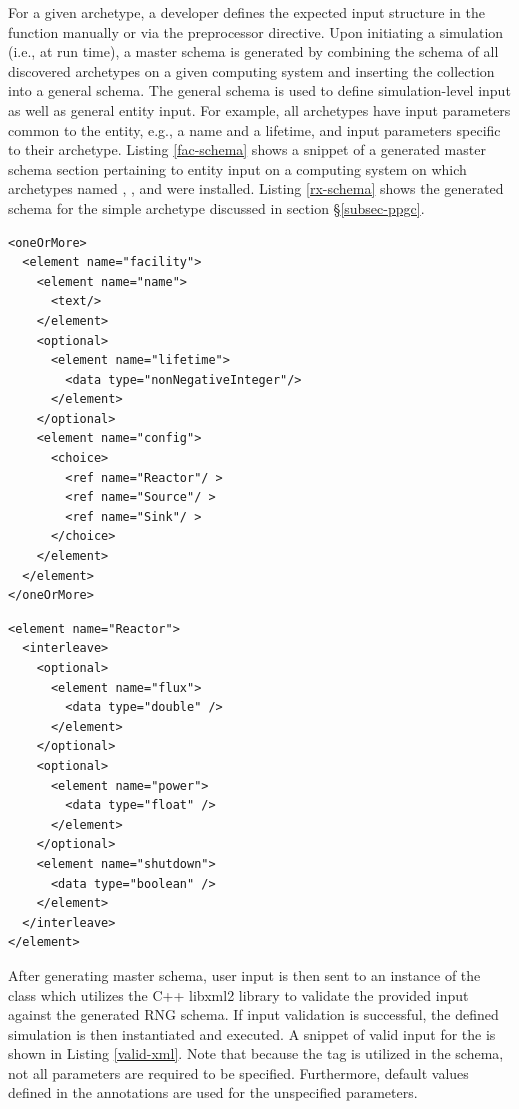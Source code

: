 For a given archetype, a developer defines the expected input structure in the
 function manually or via the 
preprocessor directive. Upon initiating a \Cyclus simulation (i.e., at run
time), a master schema is generated by combining the schema of all discovered
archetypes on a given computing system and inserting the collection into a
general \Cyclus schema. The general \Cyclus schema is used to define
simulation-level input as well as general entity input. For example, all
 archetypes have input parameters common to the
 entity, e.g., a name and a lifetime, and input
parameters specific to their archetype. Listing \ref{fac-schema} shows a snippet
of a generated \Cyclus master schema section pertaining to
 entity input on a computing system on which archetypes
named , , and  were installed. Listing
\ref{rx-schema} shows the generated schema for the simple 
archetype discussed in section \S \ref{subsec-ppgc}.

\lstset{language=XML}
\begin{lstlisting}[caption={Generated \Cyclus Facility Schema for a Computing System with 
      \code{Reactor}, \code{Source}, and \code{Sink} Archetypes Installed}, 
    label=fac-schema]
<oneOrMore>
  <element name="facility">
    <element name="name"> 
      <text/> 
    </element>
    <optional>
      <element name="lifetime"> 
        <data type="nonNegativeInteger"/> 
      </element>
    </optional>
    <element name="config">
      <choice>
        <ref name="Reactor"/ >
        <ref name="Source"/ >
        <ref name="Sink"/ >
      </choice>
    </element>
  </element>
</oneOrMore>
\end{lstlisting}

\lstset{language=XML}
\begin{lstlisting}[caption={Generated Simple Reactor Schema}, 
                   label=rx-schema]
<element name="Reactor">
  <interleave>
    <optional>
      <element name="flux">
        <data type="double" />
      </element>
    </optional>
    <optional>
      <element name="power">
        <data type="float" />
      </element>
    </optional>
    <element name="shutdown">
      <data type="boolean" />
    </element>
  </interleave>
</element>
\end{lstlisting}

After generating master \Cyclus schema, user input is then sent to an instance
of the  class which utilizes the C++ libxml2
library to validate the provided input against the generated \gls{RNG} schema. If
input validation is successful, the defined simulation is then instantiated and
executed. A snippet of valid input for the  is shown in Listing
\ref{valid-xml}. Note that because the  tag is utilized in the
schema, not all parameters are required to be specified. Furthermore, default
values defined in the   annotations are
used for the unspecified parameters.

